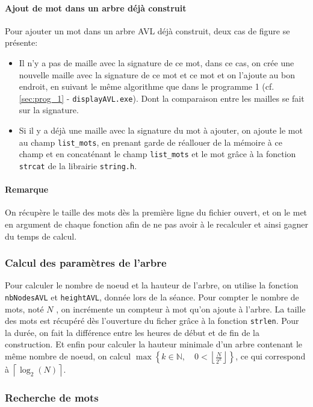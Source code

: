 \documentclass{article} %
\begin{document}
\paragraph{Ajout de mot dans un arbre déjà construit} Pour ajouter un mot dans un arbre AVL déjà construit, deux cas de figure se présente: \begin{itemize}
  \item Il n'y a pas de maille avec la signature de ce mot, dans ce cas, on crée une nouvelle maille avec la signature de ce mot et ce mot et on l'ajoute au bon endroit, en suivant le même algorithme que dans le programme 1 (cf. \ref{sec:prog_1} - \texttt{displayAVL.exe}). Dont la comparaison entre les mailles se fait sur la signature. 
  \item Si il y a déjà une maille avec la signature du mot à ajouter, on ajoute le mot au champ \texttt{list\_mots}, en prenant garde de réallouer de la mémoire à ce champ et en concaténant le champ \texttt{list\_mots} et le mot grâce à la fonction \texttt{strcat} de la librairie \texttt{string.h}.
\end{itemize}

\paragraph{Remarque} On récupère le taille des mots dès la première ligne du fichier ouvert, et on le met en argument de chaque fonction afin de ne pas avoir à le recalculer et ainsi gagner du temps de calcul. 

\subsubsection{Calcul des paramètres de l'arbre}
Pour calculer le nombre de noeud et la hauteur de l'arbre, on utilise la fonction \texttt{nbNodesAVL} et \texttt{heightAVL}, donnée lors de la séance. Pour compter le nombre de mots, noté \(N\) , on incrémente un compteur à mot qu'on ajoute à l'arbre. La taille des mots est récupéré dès l'ouverture du ficher grâce à la fonction \texttt{strlen}. Pour la durée, on fait la différence entre les heures de début et de fin de la construction. Et enfin pour calculer la hauteur minimale d’un arbre contenant le même nombre de noeud, on calcul \(\displaystyle \max \left\lbrace k \in \mathbb{N}, \quad 0 < \left\lfloor  \frac{N}{2^k} \right\rfloor  \right\rbrace \), ce qui correspond à \(\left\lceil \log_2 (N) \right\rceil \). 

\subsubsection{Recherche de mots}
\end{document}
